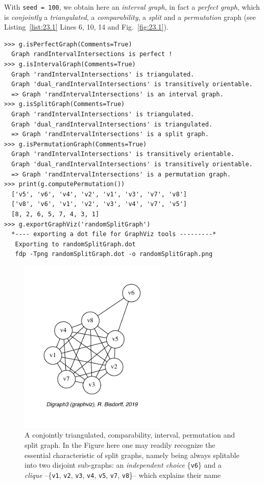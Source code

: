 With \texttt{seed = 100}, we obtain here an \emph{interval graph}, in fact a \emph{perfect graph}, which is \emph{conjointly} a \emph{triangulated}, a \emph{comparability}, a \emph{split} and a \emph{permutation} graph (see Listing~\vref{list:23.1} Lines 6, 10, 14 and Fig.~\vref{fig:23.1}).
\begin{lstlisting}[caption={Testing perfect graph categories.},label=list:23.1,basicstyle=\ttfamily\scriptsize]
>>> g.isPerfectGraph(Comments=True)
  Graph randIntervalIntersections is perfect !
>>> g.isIntervalGraph(Comments=True)
  Graph 'randIntervalIntersections' is triangulated.
  Graph 'dual_randIntervalIntersections' is transitively orientable.
  => Graph 'randIntervalIntersections' is an interval graph.
>>> g.isSplitGraph(Comments=True)
  Graph 'randIntervalIntersections' is triangulated.
  Graph 'dual_randIntervalIntersections' is triangulated.
  => Graph 'randIntervalIntersections' is a split graph.
>>> g.isPermutationGraph(Comments=True)
  Graph 'randIntervalIntersections' is transitively orientable.
  Graph 'dual_randIntervalIntersections' is transitively orientable.
  => Graph 'randIntervalIntersections' is a permutation graph.
>>> print(g.computePermutation())
  ['v5', 'v6', 'v4', 'v2', 'v1', 'v3', 'v7', 'v8']
  ['v8', 'v6', 'v1', 'v2', 'v3', 'v4', 'v7', 'v5']
  [8, 2, 6, 5, 7, 4, 3, 1]
>>> g.exportGraphViz('randomSplitGraph')
  *---- exporting a dot file for GraphViz tools ---------*
   Exporting to randomSplitGraph.dot
   fdp -Tpng randomSplitGraph.dot -o randomSplitGraph.png
\end{lstlisting}
\begin{figure}[h]
\sidecaption[t]
\includegraphics[width=7cm]{Figures/23-1-randomSplitGraph.pdf}
\caption{A conjointly triangulated, comparability, interval, permutation and split graph. In the Figure here one may readily recognize the essential characteristic of split graphs, namely being always splitable into two disjoint sub-graphs: an \emph{independent choice} \{\texttt{v6}\} and a \emph{clique}  --\{\texttt{v1}, \texttt{v2}, \texttt{v3}, \texttt{v4}, \texttt{v5}, \texttt{v7}, \texttt{v8}\}-- which explains their name} 
\label{fig:23.1}       %
\end{figure}
